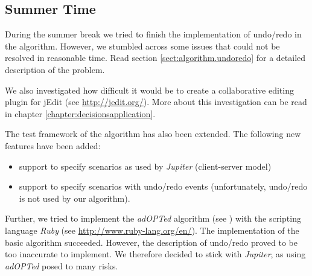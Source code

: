 \subsection{Summer Time}
During the summer break we tried to finish the implementation of undo/redo
in the algorithm. However, we stumbled across some issues that could not
be resolved in reasonable time. Read section \ref{sect:algorithm.undoredo} for
a detailed description of the problem.

We also investigated how difficult it would be to create a collaborative 
editing plugin for jEdit (see \href{http://jedit.org/}{http://jedit.org/}).
More about this investigation can be read in chapter 
\ref{chapter:decisionsapplication}.

The test framework of the algorithm has also been extended. The following 
new features have been added:
\begin{itemize}
 \item support to specify scenarios as used by \emph{Jupiter} (client-server model)
 \item support to specify scenarios with undo/redo events (unfortunately, undo/redo is not used by our algorithm).
\end{itemize}

Further, we tried to implement the \emph{adOPTed} algorithm (see 
\cite{ressel96}) with the scripting language \emph{Ruby} (see
\href{http://www.ruby-lang.org/en/}{http://www.ruby-lang.org/en/}). The
implementation of the basic algorithm succeeded. However, the description
of undo/redo proved to be too inaccurate to implement. We therefore 
decided to stick with \emph{Jupiter}, as using \emph{adOPTed} posed to many
risks.
